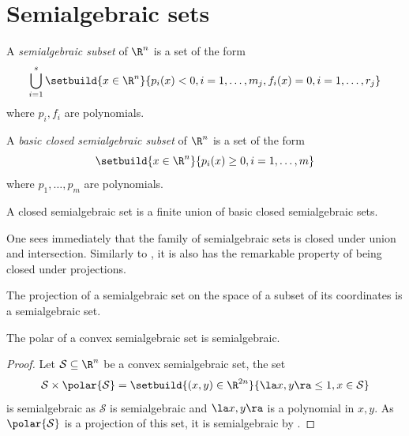 \documentclass[11pt,twoside,a4paper,openright]{uclouvain-thesis}
\begin{document}
\section{Semialgebraic sets}
\label{sec:algebraic}

\begin{mydef}
  A \emph{semialgebraic subset} of $\R^n$ is a set of the form
  \[ \bigcup_{i=1}^s \setbuild{x \in \R^n}{p_i(x) < 0, i = 1, \ldots, m_j, f_i(x) = 0, i = 1, \ldots, r_j} \]
  where $p_i, f_i$ are polynomials.
\end{mydef}

\begin{mydef}
  A \emph{basic closed semialgebraic subset} of $\R^n$ is a set of the form
  \begin{equation}
    \label{eq:bcsa}
    \setbuild{x \in \R^n}{p_i(x) \ge 0, i = 1, \ldots, m}
  \end{equation}
  where $p_1, \ldots, p_m$ are polynomials.
\end{mydef}

\begin{mytheo}
  A closed semialgebraic set is a finite union of basic closed semialgebraic sets.
\end{mytheo}

One sees immediately that the family of semialgebraic sets is closed under union and intersection.
Similarly to , it is also has the remarkable property of being closed under projections.
\begin{mytheo}
  \label{theo:tarski_seidenberg}
  The projection of a semialgebraic set on the space of a subset of its coordinates is a semialgebraic set.
\end{mytheo}

\begin{mycoro}
  \label{coro:polarsemialg}
  The polar of a convex semialgebraic set is semialgebraic.
  \begin{proof}
    Let $\mathcal{S} \subseteq \R^n$ be a convex semialgebraic set,
    the set
    \[ \mathcal{S} \times \polar{\mathcal{S}} = \setbuild{(x, y) \in \R^{2n}}{\la x, y \ra \le 1, x \in \mathcal{S}} \]
    is semialgebraic as $\mathcal{S}$ is semialgebraic
    and $\la x, y \ra$ is a polynomial in $x, y$.
    As $\polar{\mathcal{S}}$ is a projection of this set,
    it is semialgebraic by .
  \end{proof}
\end{mycoro}
\end{document}
